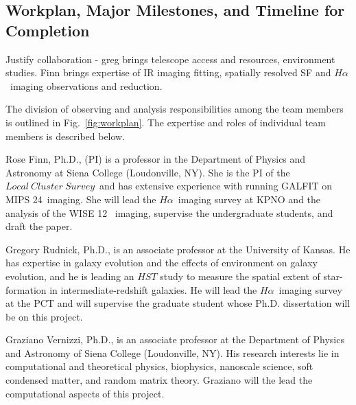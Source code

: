 \documentclass[11pt, preprint]{aastex}
\newcommand{\ha}{$H\alpha$}
\newcommand{\lcs}{$Local \ Cluster \ Survey $}
\begin{document}
{\vspace*{-.9cm}\subsection{Workplan, Major Milestones, and Timeline for Completion }
\vspace*{-.3cm}

Justify collaboration - greg brings telescope access and resources,
environment studies.  Finn brings expertise of IR imaging fitting, spatially resolved SF
and \ha \ imaging observations and reduction.

The division of observing and analysis responsibilities among the team
members is outlined in Fig.~\ref{fig:workplan}.   The expertise and
roles of individual team members is described below.

Rose Finn, Ph.D., (PI) is a professor in the Department of Physics
and Astronomy at Siena College (Loudonville, NY).  She is the PI of
the \lcs \ and has extensive experience with running GALFIT on MIPS
24\micron \ imaging.  She will lead the \ha \ imaging survey at KPNO
and the analysis of the WISE 12\micron
\ imaging, supervise the undergraduate students, and draft the paper.

Gregory Rudnick, Ph.D., is an associate professor at the University of
Kansas.  He has expertise in galaxy evolution and the effects of environment on galaxy evolution, and he is leading an
$HST$ study to measure the spatial extent of star-formation in
intermediate-redshift galaxies.  He will lead the \ha \ imaging survey
at the PCT and will supervise the graduate student whose Ph.D. dissertation will be on this project.


Graziano Vernizzi, Ph.D., is an associate professor at the Department of
Physics and Astronomy of Siena College (Loudonville, NY).
His research interests lie in computational and theoretical
physics, biophysics, nanoscale science, soft condensed matter, and
random matrix theory. 
Graziano will the lead the computational
aspects of this project.



}
\end{document}
